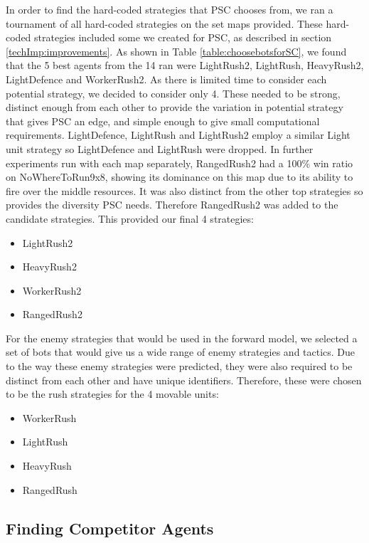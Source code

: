 \documentclass[]{article}
\begin{document}
In order to find the hard-coded strategies that PSC chooses from, we ran a tournament of all hard-coded strategies on the set maps provided. These hard-coded strategies included some we created for PSC, as described in section \ref{techImp:improvements}.  As shown in Table \ref{table:choosebotsforSC}, we found that the 5 best agents from the 14 ran were LightRush2, LightRush, HeavyRush2, LightDefence and WorkerRush2. As there is limited time to consider each potential strategy, we decided to consider only 4. These needed to be strong, distinct enough from each other to provide the variation in potential strategy that gives PSC an edge, and simple enough to give small computational requirements. LightDefence, LightRush and LightRush2 employ a similar Light unit strategy so LightDefence and LightRush were dropped. In further experiments run with each map separately, RangedRush2 had a 100\% win ratio on NoWhereToRun9x8, showing its dominance on this map due to its ability to fire over the middle resources. It was also distinct from the other top strategies so provides the diversity PSC needs. Therefore RangedRush2 was added to the candidate strategies.
This provided our final 4 strategies:

\begin{itemize}
\itemsep0em 
\item LightRush2
\item HeavyRush2
\item WorkerRush2
\item RangedRush2
\end{itemize}

For the enemy strategies that would be used in the forward model, we selected a set of bots that would give us a wide range of enemy strategies and tactics. Due to the way these enemy strategies were predicted, they were also required to be distinct from each other and have unique identifiers. Therefore, these were chosen to be the rush strategies for the 4 movable units:

\begin{itemize}
\itemsep0em
 \item WorkerRush
 \item LightRush
 \item HeavyRush
 \item RangedRush
\end{itemize}



\subsection{Finding Competitor Agents}
\end{document}
